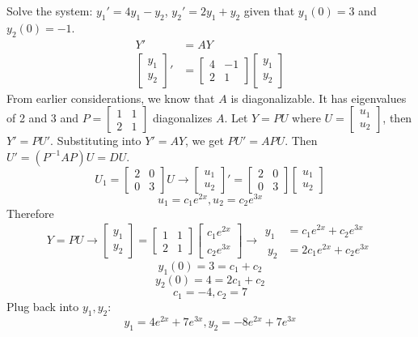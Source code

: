 \documentclass[12pt]{article}
\begin{document}
\begin{example} Solve the system: $y_1' = 4y_1 - y_2$, $y_2' = 2y_1 + y_2$ given that $y_1(0) = 3$ and $y_2(0) = -1$. 
$$\begin{aligned} Y' &= AY \\ \begin{bmatrix} y_1 \\ y_2 \end{bmatrix}' &= \begin{bmatrix} 4 & -1 \\ 2 & 1 \end{bmatrix}\begin{bmatrix} y_1 \\ y_2 \end{bmatrix} \end{aligned} $$ 
From earlier considerations, we know that $A$ is diagonalizable. It has eigenvalues of 2 and 3 and $ P = \begin{bmatrix} 1 & 1 \\ 2 & 1 \end{bmatrix}$ diagonalizes $A$. \newline Let $Y = PU$ where $U = \begin{bmatrix} u_1 \\ u_2 \end{bmatrix}$, then $Y' = PU'$. Substituting into $Y' = AY$, we get $PU' = APU$. Then $U' = (P^{-1}AP)U = DU$. $$U_1 = \begin{bmatrix} 2 & 0 \\ 0 & 3 \end{bmatrix}U \rightarrow \begin{bmatrix} u_1 \\ u_2 \end{bmatrix}' = \begin{bmatrix} 2 & 0 \\ 0 & 3 \end{bmatrix}\begin{bmatrix} u_1 \\ u_2 \end{bmatrix}$$ $$u_1 = c_1e^{2x}, u_2 = c_2e^{3x} $$ Therefore $$ Y = PU \rightarrow \begin{bmatrix} y_1 \\ y_2 \end{bmatrix} = \begin{bmatrix} 1 & 1 \\ 2 & 1 \end{bmatrix}\begin{bmatrix} c_1e^{2x} \\ c_2e^{3x} \end{bmatrix} \rightarrow \begin{aligned} y_1 &= c_1e^{2x} + c_2e^{3x} \\\ y_2 &= 2c_1e^{2x} + c_2e^{3x} \end{aligned}$$ 
$$y_1(0) = 3 = c_1 + c_2$$ $$y_2(0) = 4 = 2c_1 + c_2$$ $$c_1 = -4, c_2 = 7$$ 
Plug back into $y_1, y_2$: $$ y_1 = 4e^{2x} + 7e^{3x}, y_2 = -8e^{2x} + 7e^{3x} $$ \end{example}
\end{document}
